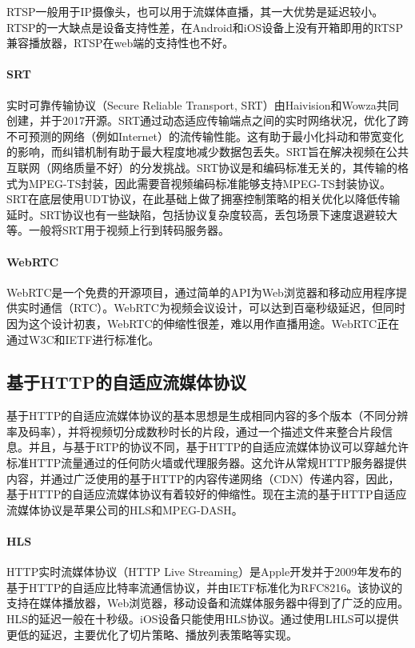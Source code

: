 RTSP一般用于IP摄像头，也可以用于流媒体直播，其一大优势是延迟较小。RTSP的一大缺点是设备支持性差，在Android和iOS设备上没有开箱即用的RTSP兼容播放器，RTSP在web端的支持性也不好。

\paragraph{SRT} 实时可靠传输协议（Secure Reliable Transport, SRT）由Haivision和Wowza共同创建，并于2017开源。SRT通过动态适应传输端点之间的实时网络状况，优化了跨不可预测的网络（例如Internet）的流传输性能。这有助于最小化抖动和带宽变化的影响，而纠错机制有助于最大程度地减少数据包丢失。SRT旨在解决视频在公共互联网（网络质量不好）的分发挑战。SRT协议是和编码标准无关的，其传输的格式为MPEG-TS封装，因此需要音视频编码标准能够支持MPEG-TS封装协议。SRT在底层使用UDT协议，在此基础上做了拥塞控制策略的相关优化以降低传输延时。SRT协议也有一些缺陷，包括协议复杂度较高，丢包场景下速度退避较大等。一般将SRT用于视频上行到转码服务器。

\paragraph{WebRTC} WebRTC是一个免费的开源项目，通过简单的API为Web浏览器和移动应用程序提供实时通信（RTC）。WebRTC为视频会议设计，可以达到百毫秒级延迟，但同时因为这个设计初衷，WebRTC的伸缩性很差，难以用作直播用途。WebRTC正在通过W3C和IETF进行标准化。

\subsection{基于HTTP的自适应流媒体协议}

基于HTTP的自适应流媒体协议的基本思想是生成相同内容的多个版本（不同分辨率及码率），并将视频切分成数秒时长的片段，通过一个描述文件来整合片段信息。并且，与基于RTP的协议不同，基于HTTP的自适应流媒体协议可以穿越允许标准HTTP流量通过的任何防火墙或代理服务器。这允许从常规HTTP服务器提供内容，并通过广泛使用的基于HTTP的内容传递网络（CDN）传递内容，因此，基于HTTP的自适应流媒体协议有着较好的伸缩性。现在主流的基于HTTP自适应流媒体协议是苹果公司的HLS和MPEG-DASH。

\paragraph{HLS} HTTP实时流媒体协议（HTTP Live Streaming）是Apple开发并于2009年发布的基于HTTP的自适应比特率流通信协议，并由IETF标准化为RFC8216\cite{pantosHTTPLiveStreaming2017}。该协议的支持在媒体播放器，Web浏览器，移动设备和流媒体服务器中得到了广泛的应用。HLS的延迟一般在十秒级。iOS设备只能使用HLS协议。通过使用LHLS可以提供更低的延迟，主要优化了切片策略、播放列表策略等实现。

